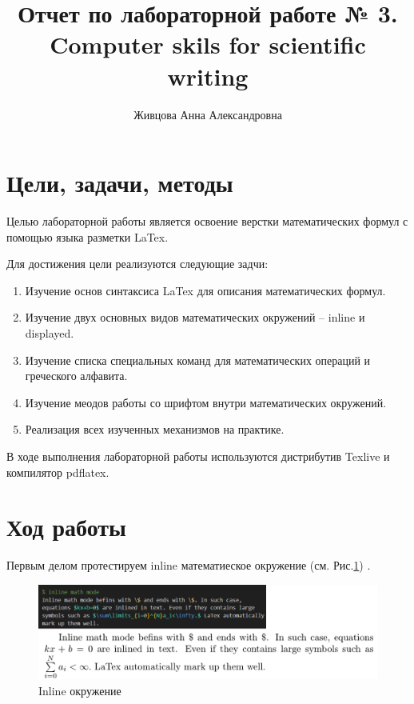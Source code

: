\documentclass{article}
\author{Живцова Анна Александровна}
\title{Отчет по лабораторной работе № 3. Computer skils for scientific writing}
\begin{document}
  \maketitle
  \pagebreak

\section{Цели, задачи, методы}

Целью лабораторной работы является освоение верстки математических формул с помощью языка разметки LaTex.

Для достижения цели реализуются следующие задчи:
  \begin{enumerate}
    \item Изучение основ синтаксиса LaTex для описания математических формул. 
    \item Изучение двух основных видов математических окружений -- inline и displayed. 
    \item Изучение списка специальных команд для математических операций и греческого алфавита.
    \item Изучение меодов работы со шрифтом внутри математических окружений.
    \item Реализация всех изученных механизмов на практике.
  \end{enumerate}

В ходе выполнения лабораторной работы используются дистрибутив Texlive и компилятор pdflatex.

\section{Ход работы}

Первым делом протестируем inline математиеское окружение (см. Рис.\ref{fig:inline_math}) \cite{book}.
  
  \begin{figure}[H]
    \centering
    \includegraphics[width=\textwidth]{images/inline_math.png}
    \caption{Inline окружение}
    \label{fig:inline_math}
  \end{figure}
\end{document}
